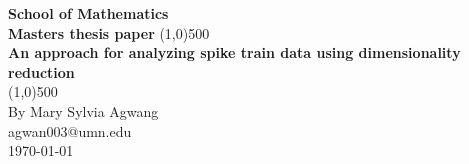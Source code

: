 


\begin{titlepage}
\begin{center}
\vspace*{1cm}  %
\Large{\textbf{School of Mathematics}}\\ %
\Large{\textbf{Masters thesis paper}} %
\vfill %
\line(1,0){500}\\[1mm]
\huge{\textbf{ An approach for analyzing spike train data using dimensionality reduction}}\\[3mm]
\line(1,0){500}\\
\vfill %
By Mary Sylvia Agwang\\
agwan003@umn.edu\\
\today %

\end{center}
\end{titlepage}



\newpage












